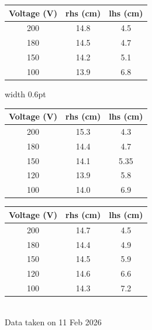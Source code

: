 \documentclass[%
sor,
 jor,
 amsmath,amssymb,
 reprint,
]{revtex4-2}
\begin{document}
\vspace{6pt}

\begin{minipage}[t]{0.48\linewidth}
\centering
{}
\begin{tabular}{|c|c|c|}
\hline
Voltage (V) & rhs (cm) & lhs (cm) \\
\hline
200 & 14.8 & 4.5 \\
180 & 14.5 & 4.7 \\
150 & 14.2 & 5.1 \\
100 & 13.9 & 6.8 \\
\hline
\end{tabular}
\end{minipage}%
\hspace{0.01\linewidth}%
\vrule width 0.6pt
\hspace{0.01\linewidth}%
\begin{minipage}[t]{0.48\linewidth}
\centering
{}
\begin{tabular}{|c|c|c|}
\hline
Voltage (V) & rhs (cm) & lhs (cm) \\
\hline
200 & 15.3 & 4.3 \\
180 & 14.4 & 4.7 \\
150 & 14.1 & 5.35 \\
120 & 13.9 & 5.8 \\
100 & 14.0 & 6.9 \\
\hline
\end{tabular}
\end{minipage}

\begin{center}
\centering
{}
\begin{tabular}{|c|c|c|}
\hline
Voltage (V) & rhs (cm) & lhs (cm) \\
\hline
200 & 14.7 & 4.5 \\
180 & 14.4 & 4.9 \\
150 & 14.5 & 5.9 \\
120 & 14.6 & 6.6 \\
100 & 14.3 & 7.2 \\
\hline
\end{tabular}
\centering
\\
\vspace{1cm}
Data taken on 11 Feb 2026
\end{center}
\end{document}
